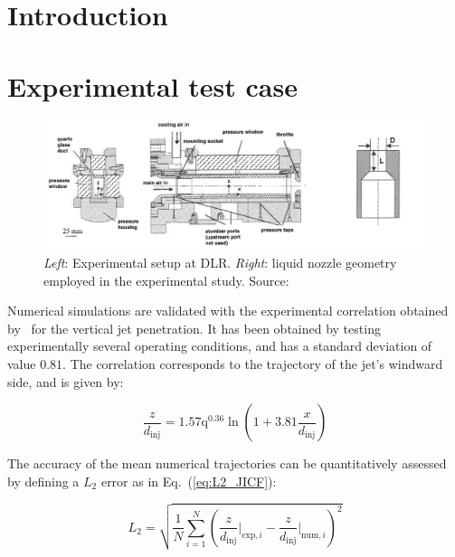 \newpage 

\section{Introduction}

\section{Experimental test case}

\begin{figure}[h!]
	\centering
	\includegraphics[scale=0.5]{./part2_developments/figures_ch5_resolved_JICF/experiment_JICF_DLR}
	\caption{\textsl{Left}: Experimental setup at DLR. \textsl{Right}: liquid nozzle geometry employed in the experimental study. Source: }
	\label{fig:experiment_JICF_DLR}
\end{figure}

Numerical simulations are validated with the experimental correlation obtained by~\cite{ref:Becker2002} for the vertical jet penetration. It has been obtained by testing experimentally several operating conditions, and has a standard deviation of value $0.81$. The correlation corresponds to the trajectory of the jet's windward side, and is given by:

\begin{equation}
    \label{eq:jicf_trajectory_becker}
    \frac{z}{d_\mathrm{inj}} = 1.57 \mathrm{q}^{0.36} \ln \left( 1 + 3.81 \frac{x}{d_\mathrm{inj}} \right)
\end{equation}

The accuracy of the mean numerical trajectories can be quantitatively assessed by defining a $L_2$ error as in Eq.~(\ref{eq:L2_JICF}): 

\begin{equation}
\label{eq:L2_JICF}
    L_2 = \sqrt{\frac{1}{N}   \sum_{i=1}^N \left( \frac{z}{d_\mathrm{inj}} \Bigr|_{\mathrm{exp},i} -   \frac{z}{d_\mathrm{inj}} \Bigr|_{\mathrm{num},i} \right)^2}
\end{equation}

